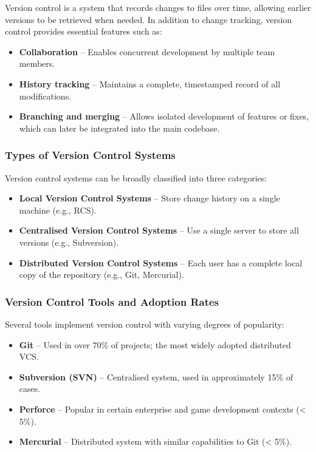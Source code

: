 \documentclass{article}
\begin{document}
Version control is a system that records changes to files over time, allowing earlier versions to be retrieved when needed. In addition to change tracking, version control provides essential features such as:

\begin{itemize}
    \item \textbf{Collaboration} – Enables concurrent development by multiple team members.
    \item \textbf{History tracking} – Maintains a complete, timestamped record of all modifications.
    \item \textbf{Branching and merging} – Allows isolated development of features or fixes, which can later be integrated into the main codebase.
\end{itemize}

\subsubsection{Types of Version Control Systems}

Version control systems can be broadly classified into three categories:

\begin{itemize}
    \item \textbf{Local Version Control Systems} – Store change history on a single machine (e.g., RCS).
    \item \textbf{Centralised Version Control Systems} – Use a single server to store all versions (e.g., Subversion).
    \item \textbf{Distributed Version Control Systems} – Each user has a complete local copy of the repository (e.g., Git, Mercurial).
\end{itemize}

\subsubsection{Version Control Tools and Adoption Rates}

Several tools implement version control with varying degrees of popularity:

\begin{itemize}
    \item \textbf{Git} – Used in over 70\% of projects; the most widely adopted distributed VCS.
    \item \textbf{Subversion (SVN)} – Centralised system, used in approximately 15\% of cases.
    \item \textbf{Perforce} – Popular in certain enterprise and game development contexts (< 5\%).
    \item \textbf{Mercurial} – Distributed system with similar capabilities to Git (< 5\%).
\end{itemize}
\end{document}
